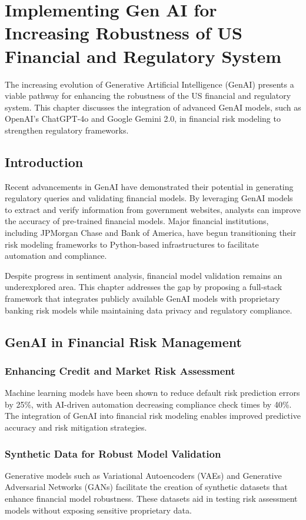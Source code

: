 \documentclass[a4paper,headinclude=on,footinclude=on,12pt,oneside]{scrbook}
\begin{document}
\chapter{Implementing Gen AI for Increasing Robustness of US Financial and Regulatory System}

The increasing evolution of Generative Artificial Intelligence (GenAI) presents a viable pathway for enhancing the robustness of the US financial and regulatory system. This chapter discusses the integration of advanced GenAI models, such as OpenAI’s ChatGPT-4o and Google Gemini 2.0, in financial risk modeling to strengthen regulatory frameworks.

\section{Introduction}
Recent advancements in GenAI have demonstrated their potential in generating regulatory queries and validating financial models. By leveraging GenAI models to extract and verify information from government websites, analysts can improve the accuracy of pre-trained financial models. Major financial institutions, including JPMorgan Chase and Bank of America, have begun transitioning their risk modeling frameworks to Python-based infrastructures to facilitate automation and compliance.

Despite progress in sentiment analysis, financial model validation remains an underexplored area. This chapter addresses the gap by proposing a full-stack framework that integrates publicly available GenAI models with proprietary banking risk models while maintaining data privacy and regulatory compliance.

\section{GenAI in Financial Risk Management}

\subsection{Enhancing Credit and Market Risk Assessment}
Machine learning models have been shown to reduce default risk prediction errors by 25\%, with AI-driven automation decreasing compliance check times by 40\%. The integration of GenAI into financial risk modeling enables improved predictive accuracy and risk mitigation strategies.

\subsection{Synthetic Data for Robust Model Validation}
Generative models such as Variational Autoencoders (VAEs) and Generative Adversarial Networks (GANs) facilitate the creation of synthetic datasets that enhance financial model robustness. These datasets aid in testing risk assessment models without exposing sensitive proprietary data.
\end{document}
